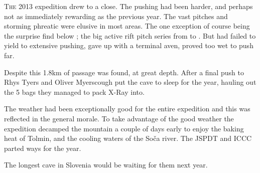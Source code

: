 \thispagestyle{endchapter}

\begin{tcolorbox}

\vspace{80pt}
	\lettrine{T}{he} 2013 expedition drew to a close. The pushing had been harder, 
	and perhaps not as immediately rewarding as the previous year. The vast pitches and storming phreatic were 
	elusive in most areas. The one exception of course being the surprise find below ; the big
	active rift pitch series from  to . But  had 
	failed to yield to extensive pushing,  gave up with a terminal aven, 
	proved too wet to push far. 
	
	Despite this 1.8km of passage was found, at great depth. After a final push to  
	Rhys Tyers and Oliver Myerscough put the cave to sleep for the year, hauling out the 5 bags they managed to 
	pack X-Ray into.
	
	The weather had been exceptionally good for the entire expedition and this was reflected in the general morale. 
	To take advantage of the good weather the expedition decamped the mountain a couple of days early to enjoy the 
	baking heat of Tolmin, and the cooling waters of the Soča river. The JSPDT and ICCC parted ways for the year.

	The longest cave in Slovenia would be waiting for them next year.

\end{tcolorbox} 
\BgThispage
